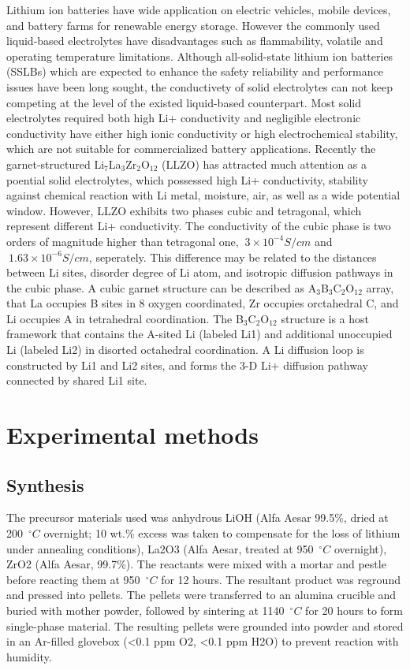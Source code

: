 \documentclass[twoside,twocolumn,9pt]{article}
\begin{document}
Lithium ion batteries have wide application on electric vehicles, mobile devices, and battery
farms for renewable energy storage.  However the commonly used liquid-based electrolytes have
disadvantages such as flammability, volatile  and operating temperature limitations.
Although all-solid-state lithium ion batteries (SSLBs) which are expected to enhance the safety
reliability and performance issues have been long sought, the conductivety of solid electrolytes can not
keep competing at the level of the existed liquid-based counterpart. Most solid electrolytes required both high Li+ conductivity and negligible electronic
conductivity have either high ionic conductivity or high electrochemical stability, which are not suitable for commercialized battery applications.
 Recently the garnet-structured
 Li$_7$La$_3$Zr$_2$O$_12$ (LLZO)\cite{ANIE:ANIE200701144} has attracted much attention as a poential solid electrolytes, which possessed high Li+ conductivity, stability against chemical
reaction with Li metal, moisture, air, as well as a wide potential window. However, LLZO exhibits two phases\cite{ic101914e}
cubic and tetragonal, which represent different Li+ conductivity. The conductivity of the cubic
phase is two orders of magnitude higher than tetragonal one, $~3\times 10^{-4} S/cm$\cite{ANIE:ANIE200701144}
and $~1.63\times 10^{-6} S/cm$\cite{AWAKA20092046}, seperately.
This difference may be related to the distances between Li sites, disorder degree of Li atom, and isotropic diffusion pathways in the cubic phase.
A cubic garnet structure can be described\cite{CUSSEN2011470} as A$_3$B$_3$C$_2$O$_{12}$ array, that La occupies B sites in 8 oxygen coordinated, Zr occupies orctahedral C,
and Li occupies A in tetrahedral coordination. The B$_3$C$_2$O$_{12}$ structure \cite{doi:10.1246/cl.2011.60} is a host framework that contains the A-sited Li (labeled Li1) and additional
unoccupied Li (labeled Li2) in disorted octahedral coordination. A Li diffusion loop is constructed by Li1 and Li2 sites, and forms the 3-D Li+ diffusion pathway connected by
shared Li1 site.

\section{Experimental methods}

\subsection{Synthesis}
The precursor materials used was anhydrous LiOH (Alfa Aesar 99.5\%, dried at 200~$^{\circ}C$ overnight; 10 wt.\% excess was taken to compensate for the loss of lithium under annealing conditions), La2O3 (Alfa Aesar, treated at 950~$^{\circ}C$ overnight), ZrO2 (Alfa Aesar, 99.7\%). The reactants were mixed with a mortar and pestle before reacting them at 950~$^{\circ}C$ for 12 hours. The resultant product was reground and pressed into pellets. The pellets were transferred to an alumina crucible and buried with mother powder, followed by sintering at 1140~$^{\circ}C$ for 20 hours to form single-phase material. The resulting pellets were grounded into powder and stored in an Ar-filled glovebox (<0.1 ppm O2, <0.1 ppm H2O) to prevent reaction with humidity.
\end{document}
